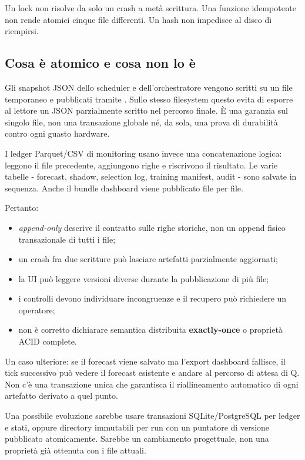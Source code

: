\documentclass[11pt,a4paper]{article}
\providecommand{\tightlist}{\setlength{\itemsep}{0pt}\setlength{\parskip}{0pt}}
\newcommand{\code}[1]{{\ttfamily\small\seqsplit{#1}}}
\begin{document}
Un lock non risolve da solo un crash a metà scrittura. Una funzione idempotente non rende atomici cinque file differenti. Un hash non impedisce al disco di riempirsi.

\subsection{Cosa è atomico e cosa non lo è}\label{cosa-uxe8-atomico-e-cosa-non-lo-uxe8}

Gli snapshot JSON dello scheduler e dell'orchestratore vengono scritti su un file temporaneo e pubblicati tramite \code{os.replace}. Sullo stesso filesystem questo evita di esporre al lettore un JSON parzialmente scritto nel percorso finale. È una garanzia sul singolo file, non una transazione globale né, da sola, una prova di durabilità contro ogni guasto hardware.

I ledger Parquet/CSV di monitoring usano invece una concatenazione logica: leggono il file precedente, aggiungono righe e riscrivono il risultato. Le varie tabelle - forecast, shadow, selection log, training manifest, audit - sono salvate in sequenza. Anche il bundle dashboard viene pubblicato file per file.

Pertanto:

\begin{itemize}
\tightlist
\item
  \emph{append-only} descrive il contratto sulle righe storiche, non un append fisico transazionale di tutti i file;
\item
  un crash fra due scritture può lasciare artefatti parzialmente aggiornati;
\item
  la UI può leggere versioni diverse durante la pubblicazione di più file;
\item
  i controlli devono individuare incongruenze e il recupero può richiedere un operatore;
\item
  non è corretto dichiarare semantica distribuita \textbf{exactly-once} o proprietà ACID complete.
\end{itemize}

Un caso ulteriore: se il forecast viene salvato ma l'export dashboard fallisce, il tick successivo può vedere il forecast esistente e andare al percorso di attesa di Q. Non c'è una transazione unica che garantisca il riallineamento automatico di ogni artefatto derivato a quel punto.

Una possibile evoluzione sarebbe usare transazioni SQLite/PostgreSQL per ledger e stati, oppure directory immutabili per run con un puntatore di versione pubblicato atomicamente. Sarebbe un cambiamento progettuale, non una proprietà già ottenuta con i file attuali.
\end{document}
